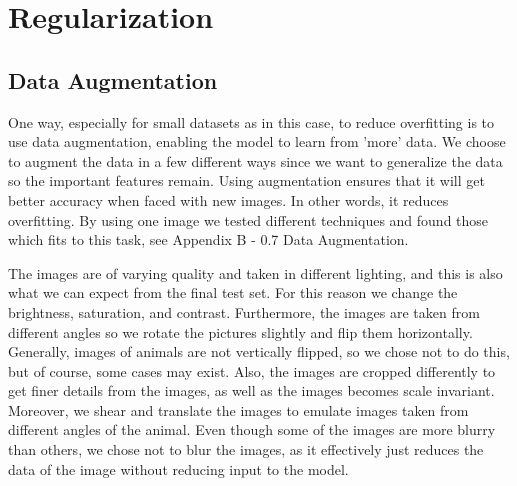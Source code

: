 \section{Regularization}

\subsection{Data Augmentation}
One way, especially for small datasets as in this case, to reduce overfitting is to use data augmentation, enabling the model to learn from 'more' data. We choose to augment the data in a few different ways since we want to generalize the data so the important features remain. Using augmentation ensures that it will get better accuracy when faced with new images. In other words, it reduces overfitting. By using one image we tested different techniques and found those which fits to this task, see Appendix B - 0.7 Data Augmentation.

The images are of varying quality and taken in different lighting, and this is also what we can expect from the final test set. For this reason we change the brightness, saturation, and contrast. Furthermore, the images are taken from different angles so we rotate the pictures slightly and flip them horizontally. Generally, images of animals are not vertically flipped, so we chose not to do this, but of course, some cases may exist. Also, the images are cropped differently to get finer details from the images, as well as the images becomes scale invariant. Moreover, we shear and translate the images to emulate images taken from different angles of the animal. Even though some of the images are more blurry than others, we chose not to blur the images, as it effectively just reduces the data of the image without reducing input to the model.

